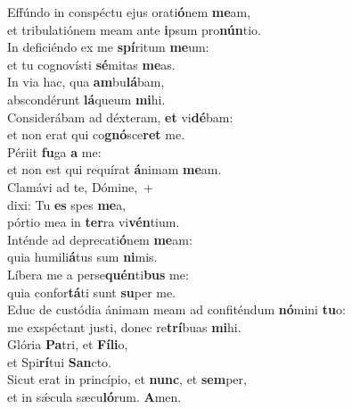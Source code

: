 \evenverse Effúndo in conspéctu ejus orati\textbf{ó}nem \textbf{me}am,~\*\\
\evenverse et tribulatiónem meam ante \textbf{i}psum pro\textbf{nún}tio.\\
\oddverse In deficiéndo ex me \textbf{spí}ritum \textbf{me}um:~\*\\
\oddverse et tu cognovísti \textbf{sé}mitas \textbf{me}as.\\
\evenverse In via hac, qua \textbf{am}bu\textbf{lá}bam,~\*\\
\evenverse abscondérunt \textbf{lá}queum \textbf{mi}hi.\\
\oddverse Considerábam ad déxteram, \textbf{et} vi\textbf{dé}bam:~\*\\
\oddverse et non erat qui co\textbf{gnó}sce\textbf{ret} me.\\
\evenverse Périit \textbf{fu}ga \textbf{a} me:~\*\\
\evenverse et non est qui requírat \textbf{á}nimam \textbf{me}am.\\
\oddverse Clamávi ad te, Dómine,~+\\
\oddverse  dixi: Tu \textbf{es} spes \textbf{me}a,~\*\\
\oddverse pórtio mea in \textbf{ter}ra vi\textbf{vén}tium.\\
\evenverse Inténde ad deprecati\textbf{ó}nem \textbf{me}am:~\*\\
\evenverse quia humili\textbf{á}tus sum \textbf{ni}mis.\\
\oddverse Líbera me a perse\textbf{quén}ti\textbf{bus} me:~\*\\
\oddverse quia confor\textbf{tá}ti sunt \textbf{su}per me.\\
\evenverse Educ de custódia ánimam meam ad confiténdum \textbf{nó}mini \textbf{tu}o:~\*\\
\evenverse me exspéctant justi, donec re\textbf{trí}buas \textbf{mi}hi.\\
\oddverse Glória \textbf{Pa}tri, et \textbf{Fí}\textbf{li}o,~\*\\
\oddverse et Spi\textbf{rí}tui \textbf{San}cto.\\
\evenverse Sicut erat in princípio, et \textbf{nunc}, et \textbf{sem}per,~\*\\
\evenverse et in sǽcula sæcu\textbf{ló}rum. \textbf{A}men.\\
